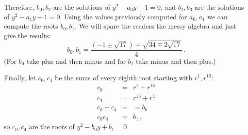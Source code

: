 \documentclass[a4paper,11pt]{article}
\begin{document}
Therefore, $b_0,b_2$ are the solutions of $y^2-a_0y-1= 0$, and $b_1,b_3$ are the solutions of $y^2-a_1y-1 =0$. Using the values previously computed for $a_0,a_1$ we can compute the roots $b_0,b_1$. We will spare the readers the messy algebra and just give the results:
\[
b_0, b_1 =\frac{(-1\pm\sqrt{17}) + \sqrt{34\mp2\sqrt{17}}}{4}\,.
\]
(For $b_0$ take plus and then minus and for $b_1$ take minus and then plus.)

Finally, let $c_0,c_4$ be the sums of every eighth root starting with $r^1,r^{13}$:
\begin{eqnarray*}
c_0&=&r^1+r^{16}\\
c_4&=&r^{13}+r^4\\
c_0+c_4&=&=b_0\\
c_0c_4&=&b_1\,,
\end{eqnarray*}
so $c_0,c_4$ are the roots of $y^2-b_0y+b_1=0$.
\end{document}
